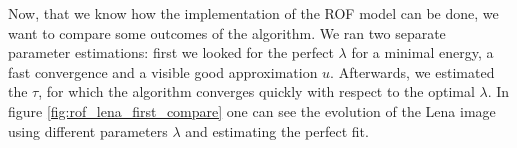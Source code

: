             Now, that we know how the implementation of the ROF model can be done, we want to compare some outcomes of the algorithm. We ran two separate parameter estimations: first we looked for the perfect $\lambda$ for a minimal energy, a fast convergence and a visible good approximation $u$. Afterwards, we estimated the $\tau$, for which the algorithm converges quickly with respect to the optimal $\lambda$. In figure \ref{fig:rof_lena_first_compare} one can see the evolution of the Lena image using different parameters $\lambda$ and estimating the perfect fit.


